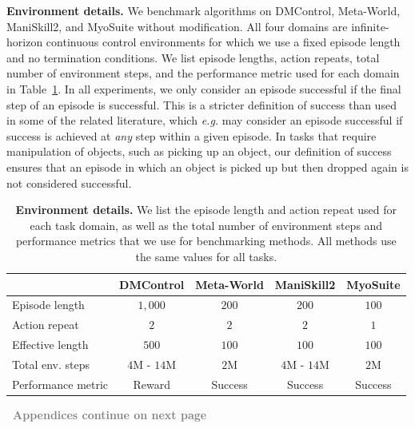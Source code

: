 \documentclass{article}
\begin{document}
\clearpage
\newpage

\textbf{Environment details.} We benchmark algorithms on DMControl, Meta-World, ManiSkill2, and MyoSuite without modification. All four domains are infinite-horizon continuous control environments for which we use a fixed episode length and no termination conditions. We list episode lengths, action repeats, total number of environment steps, and the performance metric used for each domain in Table~\ref{tab:appendix-environment-details}. In all experiments, we only consider an episode successful if the final step of an episode is successful. This is a stricter definition of success than used in some of the related literature, which \emph{e.g.} may consider an episode successful if success is achieved at \emph{any} step within a given episode. In tasks that require manipulation of objects, such as picking up an object, our definition of success ensures that an episode in which an object is picked up but then dropped again is not considered successful.

\begin{table}[h]
\centering
\parbox{\textwidth}{
\caption{\textbf{Environment details.} We list the episode length and action repeat used for each task domain, as well as the total number of environment steps and performance metrics that we use for benchmarking methods. All methods use the same values for all tasks.}
\label{tab:appendix-environment-details}
\centering
\vspace{-0.05in}
\begin{tabular}{lcccc}
\toprule
& \textbf{DMControl} & \textbf{Meta-World} & \textbf{ManiSkill2} & \textbf{MyoSuite} \\ \midrule
Episode length      & $1,000$ & $200$ & $200$ & $100$ \\
Action repeat       & $2$ & $2$ & $2$ & $1$ \\
Effective length    & $500$ & $100$ & $100$ & $100$ \\
Total env. steps    & $4$M - $14$M & $2$M & $4$M - $14$M & $2$M \\
Performance metric  & Reward & Success & Success & Success \\ \bottomrule
\end{tabular}%
}
\vspace{-0.1in}
\end{table}


\vspace{0.4in}
\begin{center}
    \textcolor{gray}{\textbf{\textemdash~Appendices continue on next page~\textemdash}}
\end{center}
\end{document}
